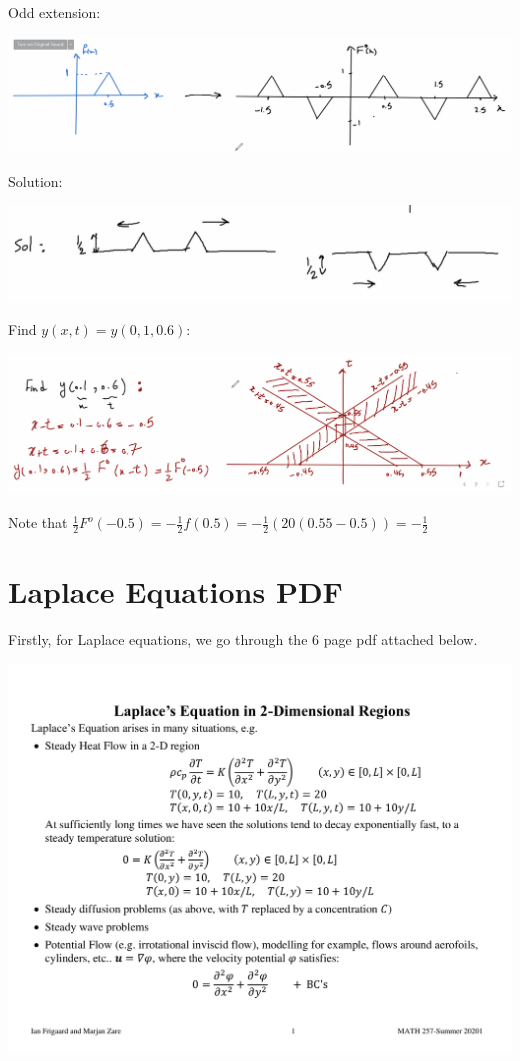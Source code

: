 \documentclass{article}
\begin{document}
Odd extension:

\includegraphics[width = 0.9 \textwidth]{image7.png}

Solution:

\includegraphics[width = 0.9 \textwidth]{image8.png}

Find $y(x,t) = y(0,1, 0.6)$:

\includegraphics[width = 0.9 \textwidth]{image9.png}

Note that $\frac{1}{2} F^o (-0.5) = - \frac{1}{2} f(0.5) = - \frac{1}{2} (20 (0.55 - 0.5)) = -\frac{1}{2}$

\section{Laplace Equations PDF}

Firstly, for Laplace equations, we go through the 6 page pdf attached below.

\includegraphics[page=1, width = 0.8 \textwidth]{Laplace Equation.pdf}
\end{document}
